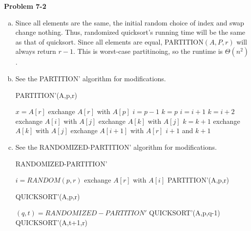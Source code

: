 \documentclass{article}
\begin{document}
\noindent\textbf{Problem 7-2}\\
\begin{enumerate}[a.]
\item  Since all elements are the same, the initial random choice of index and swap change nothing.  Thus, randomized quicksort's running time will be the same as that of quicksort.  Since all elements are equal, PARTITION$(A,P,r)$ will always return $r-1$.  This is worst-case partitinoing, so the runtime is $\Theta(n^2)$. \\

\item  See the PARTITION' algorithm for modifications.
\begin{algorithm}
\caption{PARTITION'(A,p,r)}
\begin{algorithmic}[1]
\State $x = A[r]$
\State exchange $A[r]$ with $A[p]$
\State $i=p-1$
\State $k = p$
		\State $i=i+1$
		\State $k = i+2$
		\State exchange $A[i]$ with $A[j]$
		\State exchange $A[k]$ with $A[j]$
	\EndIf
		\State $k = k+1$
		\State exchange $A[k]$ with $A[j]$
	\EndIf
\EndFor
\State exchange $A[i+1]$ with $A[r]$
\State \Return $i+1$ and $k+1$
\end{algorithmic}
\end{algorithm}


\item See the RANDOMIZED-PARTITION' algorithm for modifications.  
\begin{algorithm}
\caption{RANDOMIZED-PARTITION'}
\begin{algorithmic}[1]
\State $i=RANDOM(p,r)$
\State exchange $A[r]$ with $A[i]$
\State \Return PARTITION'(A,p,r)
\end{algorithmic}
\end{algorithm}

\begin{algorithm}
\caption{QUICKSORT'(A,p,r)}
\begin{algorithmic}[1]
	\State $(q,t) = RANDOMIZED-PARTITION'$
	\State QUICKSORT'(A,p,q-1)
	\State QUICKSORT'(A,t+1,r)
\EndIf
\end{algorithmic}
\end{algorithm}


\end{enumerate}
\end{document}
